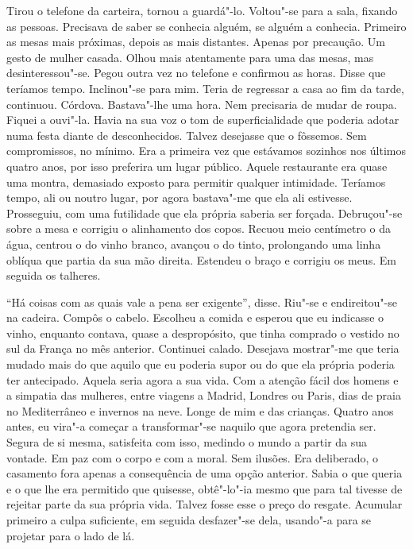 Tirou o telefone da carteira, tornou a guardá"-lo. Voltou"-se para a
sala, fixando as pessoas. Precisava de saber se conhecia alguém, se
alguém a conhecia. Primeiro as mesas mais próximas, depois as mais
distantes. Apenas por precaução. Um gesto de mulher casada. Olhou mais
atentamente para uma das mesas, mas desinteressou"-se. Pegou outra vez
no telefone e confirmou as horas. Disse que teríamos tempo. Inclinou"-se
para mim. Teria de regressar a casa ao fim da tarde, continuou. Córdova.
Bastava"-lhe uma hora. Nem precisaria de mudar de roupa. Fiquei a
ouvi"-la. Havia na sua voz o tom de superficialidade que poderia adotar
numa festa diante de desconhecidos. Talvez desejasse que o fôssemos. Sem
compromissos, no mínimo. Era a primeira vez que estávamos sozinhos nos
últimos quatro anos, por isso preferira um lugar público. Aquele
restaurante era quase uma montra, demasiado exposto para permitir
qualquer intimidade. Teríamos tempo, ali ou noutro lugar, por agora
bastava"-me que ela ali estivesse. Prosseguiu, com uma futilidade que
ela própria saberia ser forçada. Debruçou"-se sobre a mesa e corrigiu o
alinhamento dos copos. Recuou meio centímetro o da água, centrou o do
vinho branco, avançou o do tinto, prolongando uma linha oblíqua que
partia da sua mão direita. Estendeu o braço e corrigiu os meus. Em
seguida os talheres.

``Há coisas com as quais vale a pena ser exigente'',
disse. Riu"-se e endireitou"-se na cadeira. Compôs o cabelo. Escolheu a
comida e esperou que eu indicasse o vinho, enquanto contava, quase a
despropósito, que tinha comprado o vestido no sul da França no mês
anterior. Continuei calado. Desejava mostrar"-me que teria mudado mais
do que aquilo que eu poderia supor ou do que ela própria poderia ter
antecipado. Aquela seria agora a sua vida. Com a atenção fácil dos
homens e a simpatia das mulheres, entre viagens a Madrid, Londres ou
Paris, dias de praia no Mediterrâneo e invernos na neve. Longe de mim e
das crianças. Quatro anos antes, eu vira"-a começar a transformar"-se
naquilo que agora pretendia ser. Segura de si mesma, satisfeita com
isso, medindo o mundo a partir da sua vontade. Em paz com o corpo e com
a moral. Sem ilusões. Era deliberado, o casamento fora apenas a
consequência de uma opção anterior. Sabia o que queria e o que lhe era
permitido que quisesse, obtê"-lo"-ia mesmo que para tal tivesse de
rejeitar parte da sua própria vida. Talvez fosse esse o preço do
resgate. Acumular primeiro a culpa suficiente, em seguida desfazer"-se
dela, usando"-a para se projetar para o lado de lá.

